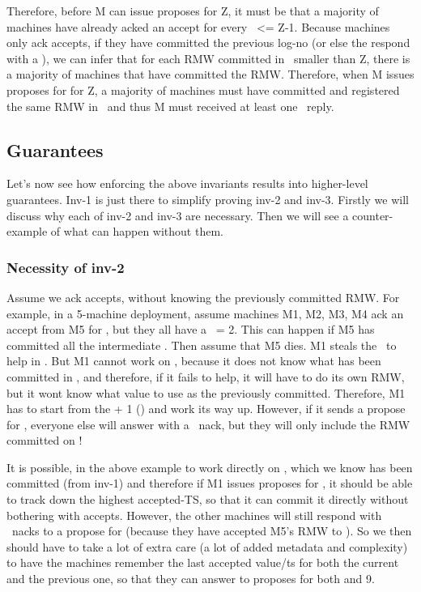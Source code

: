 Therefore, before M can issue proposes for \lognoeq Z, it must be that a majority of machines have already acked an accept for every \logno~<= Z-1.  
Because machines only ack accepts, if they have committed the previous log-no (or else the respond with a \loghigh), we can infer that for each RMW committed in \lognos~smaller than Z, there is a majority of machines that have committed the RMW. Therefore, when M issues proposes for for \lognoeq Z, a majority of machines must have committed and registered the same RMW in \lognox~and thus M must received at least one \alreadycom~reply.



\subsection{Guarantees}
Let's now see how enforcing the above invariants results into higher-level guarantees.
Inv-1 is just there to simplify proving inv-2 and inv-3.
Firstly we will discuss why each of inv-2 and inv-3 are necessary. Then we will see a counter-example of what can happen without them.

\subsubsection{Necessity of inv-2}

Assume we ack accepts, without knowing the previously committed RMW. For example, in a 5-machine deployment, assume machines M1, M2, M3, M4 ack an accept from M5 for , but they all have a \comlogno~= 2. This can happen if M5 has committed all the intermediate \lognos. Then assume that M5 dies.
M1 steals the \kv~to help in . But M1 cannot work on , because it does not know what has been committed in , and therefore, if it fails to help, it will have to do its own RMW, but it wont know what value to use as the previously committed.
Therefore, M1 has to start from the \comlogno + 1 () and work its way up.
However, if it sends a propose for , everyone else will answer with a \loglow~nack, but they will only include the RMW committed on !

\custvspace
{}
It is possible, in the above example to work directly on , which we know has been committed (from inv-1) and therefore if M1 issues proposes for , it should be able to track down the highest accepted-TS, so that it can commit it directly without bothering with accepts. However, the other machines will still respond with \loglow~nacks to a propose for  (because they have accepted M5's RMW to ). So we then should have to take a lot of extra care (a lot of added metadata and complexity) to have the machines remember the last accepted value/ts for both the current \logno~ and the previous one, so that they can answer to proposes for both  and 9.

